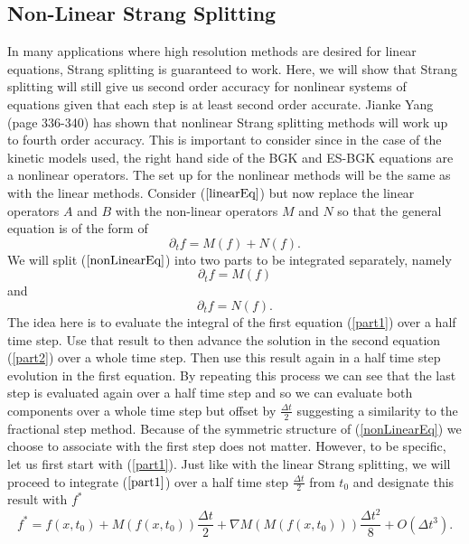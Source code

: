 \subsection{Non-Linear Strang Splitting}
In many applications where high resolution methods are desired for linear equations, Strang splitting is guaranteed to work. Here, we will show that Strang splitting will still give us second order accuracy for nonlinear systems of equations given that each step is at least second order accurate. Jianke Yang \cite{yang} (page 336-340) has shown that nonlinear Strang splitting methods will work up to fourth order accuracy. This is important to consider since in the case of the kinetic models used, the right hand side of the BGK and ES-BGK equations are a nonlinear operators. The set up for the nonlinear methods will be the same as with the linear methods. Consider ($\ref{linearEq}$) but now replace the linear operators $A$ and $B$ with the non-linear operators $M$ and $N$ so that the general equation is of the form of
\begin{equation}
\label{nonLinearEq}
\partial_t f = M(f) + N(f).
\end{equation}
%
We will split ($\ref{nonLinearEq}$) into two parts to be integrated separately, namely
\begin{equation}
\label{part1}
\partial_t f = M(f)
\end{equation}
%
and
\begin{equation}
\label{part2}
\partial_t f = N(f).
\end{equation}
%
The idea here is to evaluate the integral of the first equation (\ref{part1}) over a half time step. Use that result to then advance the solution in the second equation (\ref{part2}) over a whole time step. Then use this result again in a half time step evolution in the first equation. By repeating this process we can see that the last step is evaluated again over a half time step and so we can evaluate both components over a whole time step but offset by $\frac{\Delta t}{2}$ suggesting a similarity to the fractional step method. Because of the symmetric structure of (\ref{nonLinearEq}) we choose  to associate with the first step does not matter. However, to be specific, let us first start with (\ref{part1}). Just like with the linear Strang splitting, we will proceed to integrate ($\ref{part1}$) over a half time step $\frac{\Delta t}{2}$ from $t_0$ and designate this result with $f^*$
%
\begin{equation}
\label{v1}
f^* = f(x,t_0) + M(f(x,t_0)) \frac{\Delta t}{2} + \nabla M(M(f(x,t_0))) \frac{\Delta t^2}{8} + O(\Delta t^3).
\end{equation}
